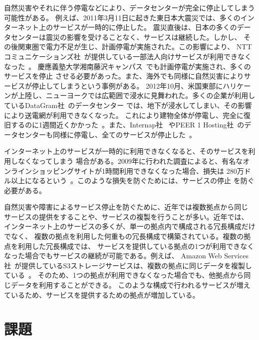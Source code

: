 自然災害やそれに伴う停電などにより、データセンターが完全に停止してしまう可能性がある。
例えば、2011年3月11日に起きた東日本大震災では、多くのインターネット上のサービスが一時的に停止した。
震災直後は、日本の多くのデータセンターは震災の影響を受けることなく、サービスは継続した。しかし、
その後関東圏で電力不足が生じ、計画停電が実施された。この影響により、
NTTコミュニケーションズ社~\cite{nttcom}が提供している一部法人向けサービスが利用できなくなった~\cite{nttpress}。
慶應義塾大学湘南藤沢キャンパス~\cite{keiosfc}でも計画停電が実施され、多くのサービスを停止
させる必要があった。また、海外でも同様に自然災害によりサービスが停止してしまうという事例がある。
2012年10月、米国東部にハリケーンが上陸し、ニューヨークでは広範囲で浸水に見舞われた。多くの企業が利用しているDataGram社~\cite{datagram}のデータセンター
では、地下が浸水してしまい、その影響により送電網が利用できなくなった。
これにより建物全体が停電し、完全に復旧するのに1週間近くかかった~\cite{datagramdown}。また、Internap社~\cite{internap}
やPEER 1 Hosting社~\cite{peer1}のデータセンターも同様に停電し、全てのサービスが停止した~\cite{nycdown}。

インターネット上のサービスが一時的に利用できなくなると、そのサービスを利用しなくなってしまう
場合がある。2009年に行われた調査によると、有名なオンラインショッピングサイトが1時間利用できなくなった場合、損失は
280万ドル以上になるという~\cite{acm:sigops}。このような損失を防ぐためには、サービスの停止
を防ぐ必要がある。

自然災害や障害によるサービス停止を防ぐために、近年では複数拠点から同じ
サービスの提供をすることや、サービスの複製を行うことが多い。近年では、
インターネット上のサービスの多くが、単一の拠点内で構成される冗長構成だけでなく、
複数の拠点を利用した何重もの冗長構成で構築されている。複数の拠点を利用した冗長構成では、
サービスを提供している拠点の1つが利用できなくなった場合でもサービスの継続が可能である。例えば、
Amazon Web Services社~\cite{aws}が提供しているS3ストレージサービスは、複数の拠点に同じデータを複製している~\cite{awswhite}。
そのため、1つの拠点が利用できなくなった場合でも、他拠点から同じデータを利用することができる。
このような構成で行われるサービスが増えているため、サービスを提供するための拠点が増加している。

\section{課題}
\label{background:internetroute}

